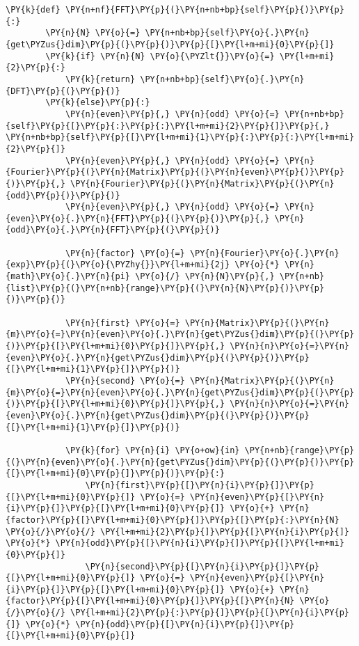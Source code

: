 \begin{Verbatim}[commandchars=\\\{\}]
    \PY{k}{def} \PY{n+nf}{FFT}\PY{p}{(}\PY{n+nb+bp}{self}\PY{p}{)}\PY{p}{:}
        \PY{n}{N} \PY{o}{=} \PY{n+nb+bp}{self}\PY{o}{.}\PY{n}{get\PYZus{}dim}\PY{p}{(}\PY{p}{)}\PY{p}{[}\PY{l+m+mi}{0}\PY{p}{]}
        \PY{k}{if} \PY{n}{N} \PY{o}{\PYZlt{}}\PY{o}{=} \PY{l+m+mi}{2}\PY{p}{:}
            \PY{k}{return} \PY{n+nb+bp}{self}\PY{o}{.}\PY{n}{DFT}\PY{p}{(}\PY{p}{)}
        \PY{k}{else}\PY{p}{:}
            \PY{n}{even}\PY{p}{,} \PY{n}{odd} \PY{o}{=} \PY{n+nb+bp}{self}\PY{p}{[}\PY{p}{:}\PY{p}{:}\PY{l+m+mi}{2}\PY{p}{]}\PY{p}{,} \PY{n+nb+bp}{self}\PY{p}{[}\PY{l+m+mi}{1}\PY{p}{:}\PY{p}{:}\PY{l+m+mi}{2}\PY{p}{]}
            \PY{n}{even}\PY{p}{,} \PY{n}{odd} \PY{o}{=} \PY{n}{Fourier}\PY{p}{(}\PY{n}{Matrix}\PY{p}{(}\PY{n}{even}\PY{p}{)}\PY{p}{)}\PY{p}{,} \PY{n}{Fourier}\PY{p}{(}\PY{n}{Matrix}\PY{p}{(}\PY{n}{odd}\PY{p}{)}\PY{p}{)}
            \PY{n}{even}\PY{p}{,} \PY{n}{odd} \PY{o}{=} \PY{n}{even}\PY{o}{.}\PY{n}{FFT}\PY{p}{(}\PY{p}{)}\PY{p}{,} \PY{n}{odd}\PY{o}{.}\PY{n}{FFT}\PY{p}{(}\PY{p}{)}
            
            \PY{n}{factor} \PY{o}{=} \PY{n}{Fourier}\PY{o}{.}\PY{n}{exp}\PY{p}{(}\PY{o}{\PYZhy{}}\PY{l+m+mi}{2j} \PY{o}{*} \PY{n}{math}\PY{o}{.}\PY{n}{pi} \PY{o}{/} \PY{n}{N}\PY{p}{,} \PY{n+nb}{list}\PY{p}{(}\PY{n+nb}{range}\PY{p}{(}\PY{n}{N}\PY{p}{)}\PY{p}{)}\PY{p}{)}
            
            \PY{n}{first} \PY{o}{=} \PY{n}{Matrix}\PY{p}{(}\PY{n}{m}\PY{o}{=}\PY{n}{even}\PY{o}{.}\PY{n}{get\PYZus{}dim}\PY{p}{(}\PY{p}{)}\PY{p}{[}\PY{l+m+mi}{0}\PY{p}{]}\PY{p}{,} \PY{n}{n}\PY{o}{=}\PY{n}{even}\PY{o}{.}\PY{n}{get\PYZus{}dim}\PY{p}{(}\PY{p}{)}\PY{p}{[}\PY{l+m+mi}{1}\PY{p}{]}\PY{p}{)}
            \PY{n}{second} \PY{o}{=} \PY{n}{Matrix}\PY{p}{(}\PY{n}{m}\PY{o}{=}\PY{n}{even}\PY{o}{.}\PY{n}{get\PYZus{}dim}\PY{p}{(}\PY{p}{)}\PY{p}{[}\PY{l+m+mi}{0}\PY{p}{]}\PY{p}{,} \PY{n}{n}\PY{o}{=}\PY{n}{even}\PY{o}{.}\PY{n}{get\PYZus{}dim}\PY{p}{(}\PY{p}{)}\PY{p}{[}\PY{l+m+mi}{1}\PY{p}{]}\PY{p}{)}
            
            \PY{k}{for} \PY{n}{i} \PY{o+ow}{in} \PY{n+nb}{range}\PY{p}{(}\PY{n}{even}\PY{o}{.}\PY{n}{get\PYZus{}dim}\PY{p}{(}\PY{p}{)}\PY{p}{[}\PY{l+m+mi}{0}\PY{p}{]}\PY{p}{)}\PY{p}{:}
                \PY{n}{first}\PY{p}{[}\PY{n}{i}\PY{p}{]}\PY{p}{[}\PY{l+m+mi}{0}\PY{p}{]} \PY{o}{=} \PY{n}{even}\PY{p}{[}\PY{n}{i}\PY{p}{]}\PY{p}{[}\PY{l+m+mi}{0}\PY{p}{]} \PY{o}{+} \PY{n}{factor}\PY{p}{[}\PY{l+m+mi}{0}\PY{p}{]}\PY{p}{[}\PY{p}{:}\PY{n}{N} \PY{o}{/}\PY{o}{/} \PY{l+m+mi}{2}\PY{p}{]}\PY{p}{[}\PY{n}{i}\PY{p}{]} \PY{o}{*} \PY{n}{odd}\PY{p}{[}\PY{n}{i}\PY{p}{]}\PY{p}{[}\PY{l+m+mi}{0}\PY{p}{]}
                \PY{n}{second}\PY{p}{[}\PY{n}{i}\PY{p}{]}\PY{p}{[}\PY{l+m+mi}{0}\PY{p}{]} \PY{o}{=} \PY{n}{even}\PY{p}{[}\PY{n}{i}\PY{p}{]}\PY{p}{[}\PY{l+m+mi}{0}\PY{p}{]} \PY{o}{+} \PY{n}{factor}\PY{p}{[}\PY{l+m+mi}{0}\PY{p}{]}\PY{p}{[}\PY{n}{N} \PY{o}{/}\PY{o}{/} \PY{l+m+mi}{2}\PY{p}{:}\PY{p}{]}\PY{p}{[}\PY{n}{i}\PY{p}{]} \PY{o}{*} \PY{n}{odd}\PY{p}{[}\PY{n}{i}\PY{p}{]}\PY{p}{[}\PY{l+m+mi}{0}\PY{p}{]}
            

\end{Verbatim}
